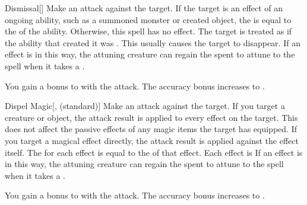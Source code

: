 \lowercase{\hypertarget{spell:Dismissal}{}}\label{spell:Dismissal}
\begin{freeability}[Rank 3]{\hypertarget{spell:Dismissal}{Dismissal}}[]
Make an attack against the target.
If the target is an effect of an ongoing  ability, such as a summoned monster or created object, the  is equal to the  of the ability.
Otherwise, this spell has no effect.
\hit The target is treated as if the ability that created it was .
This usually causes the target to disappear.
If an  effect is  in this way,
the attuning creature can regain the  spent to attune to the spell when it takes a .

\rankline
{} You gain a  bonus to  with the attack.
 The accuracy bonus increases to .
\end{freeability}
\vspace{0.25em}



\lowercase{\hypertarget{spell:Dispel Magic}{}}\label{spell:Dispel Magic}
\begin{freeability}[Rank 3]{\hypertarget{spell:Dispel Magic}{Dispel Magic}}[,  (standard)]
Make an attack against the target.
If you target a creature or object, the attack result is applied to every  effect on the target.
This does not affect the passive effects of any magic items the target has equipped.
If you target a magical effect directly, the attack result is applied against the effect itself.
The  for each effect is equal to the  of that effect.
\hit Each effect is 
If an  effect is  in this way,
the attuning creature can regain the  spent to attune to the spell when it takes a .

\rankline
{} You gain a  bonus to  with the attack.
 The accuracy bonus increases to .
\end{freeability}
\vspace{0.25em}



